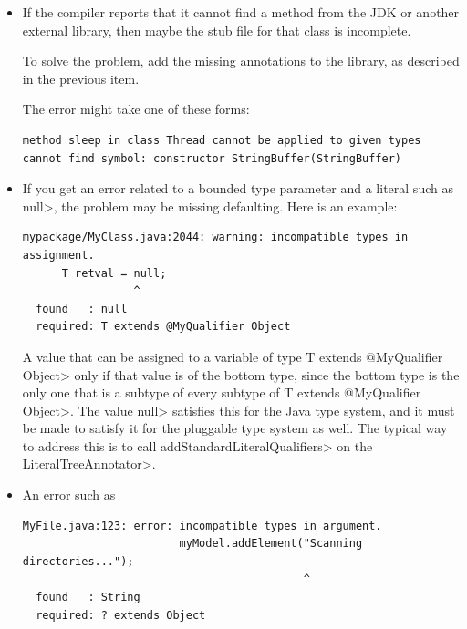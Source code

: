\begin{itemize}
To solve the problem, add the missing annotations to the library (see
Chapter~\ref{annotating-libraries}).  Depending on the checker, the
annotations might be expressed in the form of stub files (which appear
together with the checker's source code, such as in file
 for the
Interning Checker) or in the form of annotated libraries (which appear
under , such as at  for
the Nullness Checker.

\item
If the compiler reports that it cannot find a method from the JDK or
another external library, then maybe the stub file for that class
is incomplete.

To solve the problem, add the missing annotations to the library, as
described in the previous item.

The error might take one of these forms:

\begin{Verbatim}
method sleep in class Thread cannot be applied to given types
cannot find symbol: constructor StringBuffer(StringBuffer)
\end{Verbatim}

\item
If you get an error related to a bounded type parameter and a literal such
as \<null>, the problem may be missing defaulting.  Here is an example:

\begin{Verbatim}
mypackage/MyClass.java:2044: warning: incompatible types in assignment.
      T retval = null;
                 ^
  found   : null
  required: T extends @MyQualifier Object
\end{Verbatim}

\noindent
A value that can be assigned to a variable of type \<T extends @MyQualifier
Object> only if that value is of the bottom type, since the bottom type is
the only one that is a subtype of every subtype of \<T extends @MyQualifier
Object>.  The value \<null> satisfies this for the Java type system, and it
must be made to satisfy it for the pluggable type system as well.  The
typical way to address this is to call \<addStandardLiteralQualifiers> on the \<LiteralTreeAnnotator>.

\item
An error such as

\begin{Verbatim}
MyFile.java:123: error: incompatible types in argument.
                        myModel.addElement("Scanning directories...");
                                           ^
  found   : String
  required: ? extends Object
\end{Verbatim}


\end{itemize}
